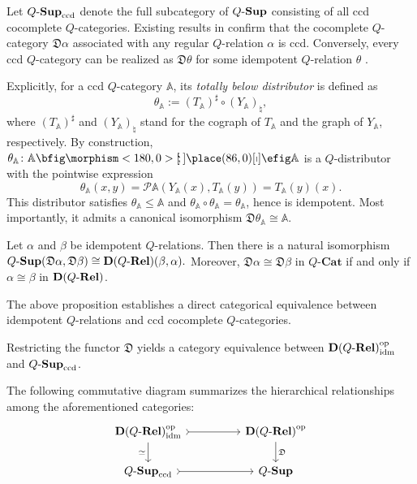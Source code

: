 \documentclass{tac}
\begin{document}
Let ${Q\text{-}\mathbf{Sup}}_{\mathrm{ccd}}$ denote the full subcategory of ${Q\text{-}\mathbf{Sup}}$ consisting of all ccd cocomplete $Q$-categories. Existing results in \cite{LaiShen2018,Stubbe2007b} confirm that the cocomplete $Q$-category $\mathfrak{D}\alpha$ associated with any regular $Q$-relation $\alpha$ is ccd. Conversely, every ccd $Q$-category can be realized as $\mathfrak{D}\theta$ for some idempotent $Q$-relation $\theta$ \cite{LaiShen2018,Stubbe2007b}.

Explicitly, for a ccd $Q$-category $\mathbb{A}$, its \emph{totally below distributor} \cite{Stubbe2007b} is defined as
\[
\theta_{\mathbb{A}}:=(T_{\mathbb{A}})^{\sharp}\circ(Y_{\mathbb{A}})_{\natural},
\]
where $(T_{\mathbb{A}})^{\sharp}$ and $(Y_{\mathbb{A}})_{\natural}$ stand for the cograph of $T_{\mathbb{A}}$ and the graph of $Y_{\mathbb{A}}$, respectively. By construction, $\theta_{\mathbb{A}}\colon\mathbb{A}\nto\mathbb{A}$ is a $Q$-distributor with the pointwise expression
\[
\theta_{\mathbb{A}}(x,y)=\mathcal{P}\mathbb{A}(Y_{\mathbb{A}}(x),T_{\mathbb{A}}(y))=T_{\mathbb{A}}(y)(x).
\]
This distributor satisfies $\theta_{\mathbb{A}}\leq\mathbb{A}$ and $\theta_{\mathbb{A}}\circ\theta_{\mathbb{A}}=\theta_{\mathbb{A}}$, hence is idempotent. Most importantly, it admits a canonical isomorphism $\mathfrak{D}\theta_{\mathbb{A}}\cong\mathbb{A}$.

\begin{proposition}\label{prop:idm-hom}
Let \(\alpha\) and \(\beta\) be idempotent \(Q\)-relations. Then there is a natural isomorphism
$
{Q\text{-}\mathbf{Sup}}(\mathfrak{D}\alpha,\mathfrak{D}\beta)
\cong {\mathbf{D}(Q\text{-}\mathbf{Rel})}(\beta,\alpha).
$
Moreover, \(\mathfrak{D}\alpha\cong\mathfrak{D}\beta\) in \(Q\text{-}\mathbf{Cat}\) if and only if \(\alpha\cong\beta\) in \({\mathbf{D}(Q\text{-}\mathbf{Rel})}\).
\end{proposition}

The above proposition establishes a direct categorical equivalence between idempotent $Q$-relations and ccd cocomplete $Q$-categories.

\begin{corollary}\label{cor:D-equivalence}
Restricting the functor $\mathfrak{D}$ yields a category equivalence between ${\mathbf{D}(Q\text{-}\mathbf{Rel})}_{\mathrm{idm}}^{\mathrm{op}}$ and ${Q\text{-}\mathbf{Sup}}_{\mathrm{ccd}}$.
\end{corollary}

The following commutative diagram summarizes the hierarchical relationships among the aforementioned categories:
\[
\begin{tikzcd}
\DQRel_{\mathrm{idm}}^{\op}
\arrow[>->]{rr}{} \arrow{d}[swap]{\simeq} &&
\DQRel^{\op} \arrow{d}{\mathfrak{D}} \\
\QSup_{\mathrm{ccd}}\arrow[>->]{rr}{}&&
 \QSup
\end{tikzcd}
\]
\end{document}
